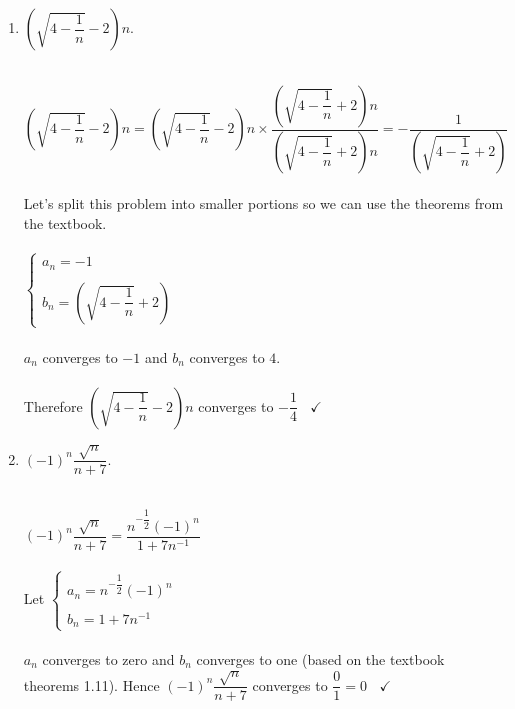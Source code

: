 \documentclass[fleqn]{article}
\begin{document}
\begin{enumerate}
\begin{enumerate}
      \item $\left(\sqrt{4-\dfrac{1}{n}}-2\right)n$.
      
        \textcolor{hwColor}{
          \\
          $
            \left(\sqrt{4-\dfrac{1}{n}}-2\right)n=\left(\sqrt{4-\dfrac{1}{n}}-2\right)n \times \dfrac{\left(\sqrt{4-\dfrac{1}{n}}+2\right)n}{\left(\sqrt{4-\dfrac{1}{n}}+2\right)n}
            =-\dfrac{1}{\left(\sqrt{4-\dfrac{1}{n}}+2\right)}
          $
          \\
          \\
          Let's split this problem into smaller portions so we can use the theorems from the textbook. 
          \\
          \\
          $
            \begin{cases}
              a_n=-1
              \\
              \\
              b_n=\left(\sqrt{4-\dfrac{1}{n}}+2\right)
            \end{cases}
          $
          \\
          \\
          $a_n$ converges to $-1$ and $b_n$ converges to $4$.
          \\
          \\
          Therefore $\left(\sqrt{4-\dfrac{1}{n}}-2\right)n$ converges to $-\dfrac{1}{4} ~~~~ \checkmark$
          \\
        }

      \item $(-1)^n \dfrac{\sqrt{n}}{n+7}$.
      
        \textcolor{hwColor}{
          \\
          $
            (-1)^n \dfrac{\sqrt{n}}{n+7}=\dfrac{n^{-\dfrac{1}{2}}(-1)^n}{1+7n^{-1}}
          $
          \\
          \\
          Let $\begin{cases}
            a_n=n^{-\dfrac{1}{2}}(-1)^n
            \\
            \\
            b_n=1+7n^{-1}
          \end{cases}$
          \\
          \\
          $a_n$ converges to zero and $b_n$ converges to one (based on the textbook theorems 1.11).
          Hence $(-1)^n \dfrac{\sqrt{n}}{n+7}$ converges to $\dfrac{0}{1}=0 ~~~~ \checkmark$
          \\
        }

    \end{enumerate}

  \end{enumerate}
\end{document}

